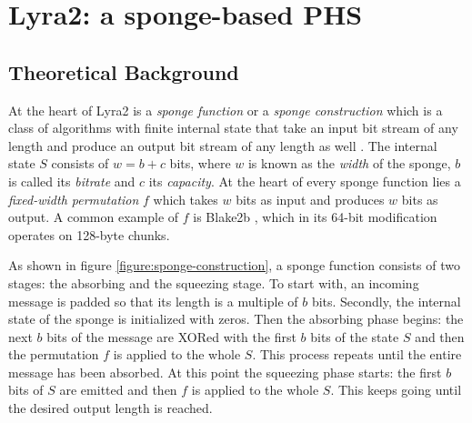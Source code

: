 \chapter{Lyra2: a sponge-based PHS}
\label{sec:implementation-details}
\label{chapter:lyra2}

\section{Theoretical Background}
\label{sec:lyra2-brief-description}

At the heart of Lyra2 is a \emph{sponge function} or a \emph{sponge construction} which is a class of algorithms with finite internal state that take an input bit stream of any length and produce an output bit stream of any length as well \cite{wiki:2017:sponge-function}. The internal state \(S\) consists of \(w = b + c\) bits, where \(w\) is known as the \emph{width} of the sponge, \(b\) is called its \emph{bitrate} and \(c\) its \emph{capacity}. At the heart of every sponge function lies a \emph{fixed-width permutation} \(f\) which takes \(w\) bits as input and produces \(w\) bits as output. A common example of \(f\) is Blake2b \cite{aumasson:2013:blake2}, which in its 64-bit modification operates on 128-byte chunks.

As shown in figure \ref{figure:sponge-construction}, a sponge function consists of two stages: the absorbing and the squeezing stage. To start with, an incoming message is padded so that its length is a multiple of \(b\) bits. Secondly, the internal state of the sponge is initialized with zeros. Then the absorbing phase begins: the next \(b\) bits of the message are XORed with the first \(b\) bits of the state \(S\) and then the permutation \(f\) is applied to the whole \(S\). This process repeats until the entire message has been absorbed. At this point the squeezing phase starts: the first \(b\) bits of \(S\) are emitted and then \(f\) is applied to the whole \(S\). This keeps going until the desired output length is reached.

